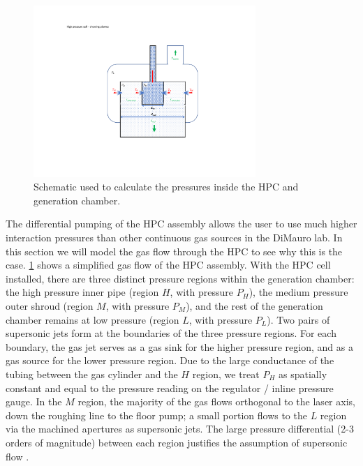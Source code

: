 \begin{figure}
	\centering
	\includegraphics[width=0.75\textwidth]{figures/chap3/HPC_pressure_schematic.pdf}
	\caption{Schematic used to calculate the pressures inside the HPC and generation chamber.}
	\label{fig:HPC_pressure_schematic}
\end{figure}

The differential pumping of the HPC assembly allows the user to use much higher interaction pressures than other continuous gas sources in the DiMauro lab. In this section we will model the gas flow through the HPC to see why this is the case. \cref{fig:HPC_pressure_schematic} shows a simplified gas flow of the HPC assembly. With the HPC cell installed, there are three distinct pressure regions within the generation chamber: the high pressure inner pipe (region $H$, with pressure $P_H$), the medium pressure outer shroud (region $M$, with pressure $P_M$), and the rest of the generation chamber remains at low pressure (region $L$, with pressure $P_L$). Two pairs of supersonic jets form at the boundaries of the three pressure regions. For each boundary, the gas jet serves as a gas sink for the higher pressure region, and as a gas source for the lower pressure region. Due to the large conductance of the tubing between the gas cylinder and the $H$ region, we treat $P_H$ as spatially constant and equal to the pressure reading on the regulator / inline pressure gauge. In the $M$ region, the majority of the gas flows orthogonal to the laser axis, down the roughing line to the floor pump; a small portion flows to the $L$ region via the machined apertures as supersonic jets. The large pressure differential (2-3 orders of magnitude) between each region justifies the assumption of supersonic flow \cite{millerFreeJetSources1988}.

